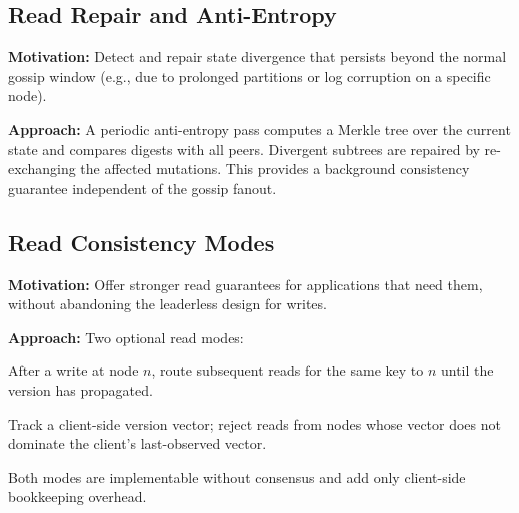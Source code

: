 \subsection{Read Repair and Anti-Entropy}

\textbf{Motivation:} Detect and repair state divergence that persists beyond
the normal gossip window (e.g., due to prolonged partitions or log corruption
on a specific node).

\textbf{Approach:} A periodic anti-entropy pass computes a Merkle tree over
the current state and compares digests with all peers. Divergent subtrees are
repaired by re-exchanging the affected mutations. This provides a background
consistency guarantee independent of the gossip fanout.

\subsection{Read Consistency Modes}

\textbf{Motivation:} Offer stronger read guarantees for applications that need
them, without abandoning the leaderless design for writes.

\textbf{Approach:} Two optional read modes:
\begin{description}[leftmargin=1.5em]
  \item[Read-your-writes:] After a write at node $n$, route subsequent reads
        for the same key to $n$ until the version has propagated.
  \item[Monotonic reads:] Track a client-side version vector; reject reads from
        nodes whose vector does not dominate the client's last-observed vector.
\end{description}
Both modes are implementable without consensus and add only client-side
bookkeeping overhead.
